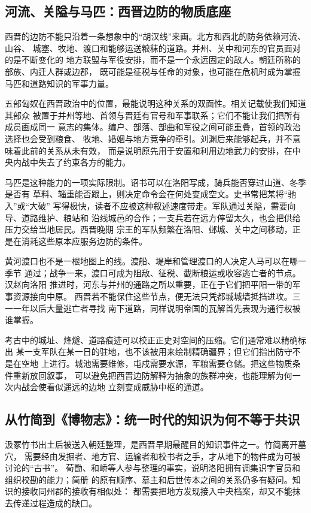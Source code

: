 \subsection{河流、关隘与马匹：西晋边防的物质底座}

西晋的边防不能只沿着一条想象中的“胡汉线”来画。北方和西北的防务依赖河流、山谷、
城塞、牧地、渡口和能够运送粮秣的道路。并州、关中和河东的官员面对的是不断变化的
地方联盟与军役安排，而不是一个永远固定的敌人。朝廷所称的部族、内迁人群或边郡，
既可能是征税与任命的对象，也可能在危机时成为掌握马匹和道路知识的军事力量。

五部匈奴在西晋政治中的位置，最能说明这种关系的双面性。相关记载使我们知道其部众
被置于并州等地、首领与晋廷有官号和军事联系；它们不能让我们把所有成员画成同一
意志的集体。编户、部落、部曲和军役之间可能重叠，首领的政治选择也会受到粮食、
牧地、婚姻与地方竞争的牵引。刘渊后来能够起兵，并不意味着此前的关系从未有效，
而是说明原先用于安置和利用边地武力的安排，在中央内战中失去了约束各方的能力。

马匹是这种能力的一项实际限制。诏书可以在洛阳写成，骑兵能否穿过山道、冬季是否有
草料、辎重能否跟上，则决定命令会在何处变成空文。史书常把某将“驰入”或“大破”
写得极快，读者不应被这种叙述速度带走。军队通过关隘，需要向导、道路维护、粮站和
沿线城邑的合作；一支兵若在远方停留太久，也会把供给压力交给当地居民。西晋晚期
宗王的军队频繁在洛阳、邺城、关中之间移动，正是在消耗这些原本应服务边防的条件。

黄河渡口也不是一根地图上的线。渡船、堤岸和管理渡口的人决定人马可以在哪一季节
通过；战争一来，渡口可成为阻敌、征税、截断粮运或收容逃亡者的节点。汉赵向洛阳
推进时，河东与并州的通路之所以重要，正在于它们把平阳一带的军事资源接向中原。
西晋若不能保住这些节点，便无法只凭都城城墙抵挡进攻。三一一年以后大量逃亡者寻找
南下道路，同样说明帝国的瓦解首先表现为通行权被谁掌握。

考古中的城址、烽燧、道路痕迹可以校正正史对空间的压缩。它们通常难以精确标出
某一支军队在某一日的驻地，也不该被用来绘制精确疆界；但它们指出防守不是在空地
上进行。城池需要维修，屯戍需要水源，军粮需要仓储。把这些物质条件重新放回叙事，
可以避免把西晋边防解释为抽象的族群冲突，也能理解为何一次内战会使看似遥远的边地
立刻变成威胁中枢的通道。

\subsection{从竹简到《博物志》：统一时代的知识为何不等于共识}

汲冢竹书出土后被送入朝廷整理，是西晋早期最醒目的知识事件之一。竹简离开墓穴，
需要经由发掘者、地方官、运输者和校书者之手，才从地下的物件成为可被讨论的“古书”。
荀勖、和峤等人参与整理的事实，说明洛阳拥有调集识字官员和组织校勘的能力；简册
的原有顺序、墓主和后世传本之间的关系仍多有疑问。知识的接收同州郡的接收有相似处：
都需要把地方发现接入中央档案，却又不能抹去传递过程造成的缺口。

